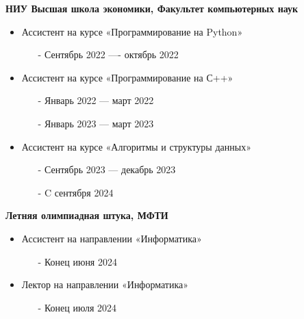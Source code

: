 \documentclass[10pt,a4paper]{altacv}
\begin{document}
\item[] \textbf{НИУ Высшая школа экономики, Факультет компьютерных наук}
\begin{itemize}
    \item Ассистент на курсе «Программирование на Python»
    \begin{itemize}
        \item[-] Сентябрь 2022 ---- октябрь 2022
    \end{itemize}
    \item Ассистент на курсе «Программирование на С++»
    \begin{itemize}
        \item[-] Январь 2022 --- март 2022
        \item[-] Январь 2023 --- март 2023
    \end{itemize}
    \item Ассистент на курсе «Алгоритмы и структуры данных»
    \begin{itemize}
        \item[-] Сентябрь 2023 --- декабрь 2023
        \item[-] C сентября 2024
    \end{itemize}
\end{itemize}

\item[] \textbf{Летняя олимпиадная штука, МФТИ}
\begin{itemize}
    \item Ассистент на направлении «Информатика»
    \begin{itemize}
        \item[-] Конец июня 2024
    \end{itemize}
        \item Лектор на направлении «Информатика»
    \begin{itemize}
        \item[-] Конец июля 2024
    \end{itemize}
\end{itemize}

\clearpage
\end{document}
